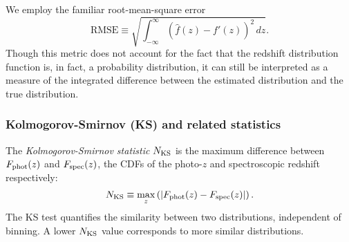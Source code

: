 We employ the familiar root-mean-square error
\begin{equation}
\mathrm{RMSE} \equiv \sqrt{\int_{-\infty}^{\infty}\left(\hat{f}(z)-f'(z)\right)^{2}\,dz} .
\end{equation}
Though this metric does not account for the fact that the redshift distribution function is, in fact, a probability distribution, it can still be interpreted as a measure of the integrated difference between the estimated distribution and the true distribution.%


\subsubsection{Kolmogorov-Smirnov (KS) and related statistics}
\label{sec:ks}

The \textit{Kolmogorov-Smirnov statistic} $N_{\rm KS}$ is the maximum difference between $F_{\rm phot}(z)$ and $F_{\rm spec}(z)$, the CDFs of the photo-$z$ and spectroscopic redshift respectively:
\begin{equation}
N_{\rm KS} \equiv \max_{z}\left( \left| F_{\rm phot}(z) - F_{\rm spec}(z) \right| \right).
\end{equation}
The KS test quantifies the similarity between two distributions, independent of binning.
A lower $N_{\rm KS}$ value corresponds to more similar distributions.

